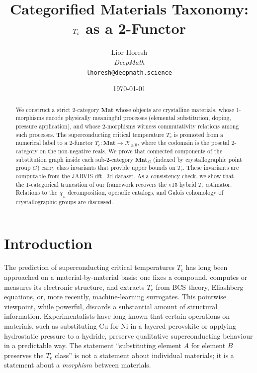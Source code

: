\documentclass[12pt,a4paper]{article}
\title{Categorified Materials Taxonomy:\\
$\Tc$ as a 2-Functor}
\author{Lior Horesh\\[4pt]
\textit{DeepMath}\\[2pt]
\texttt{lhoresh@deepmath.science}}
\date{\today}
\theoremstyle{plain}
\theoremstyle{definition}
\theoremstyle{remark}
\newcommand{\Tc}{T_{\mathrm{c}}}
\newcommand{\Matl}{\mathbf{Mat}}
\newcommand{\MatlG}{\mathbf{Mat}_G}
\newcommand{\chin}{\chi_n}
\begin{document}
\maketitle

\begin{abstract}
We construct a strict 2-category $\Matl$ whose objects are crystalline
materials, whose 1-morphisms encode physically meaningful processes (elemental
substitution, doping, pressure application), and whose 2-morphisms witness
commutativity relations among such processes.  The superconducting critical
temperature $\Tc$ is promoted from a numerical label to a 2-functor
$\Tc \colon \Matl \to \mathscr{R}_{\geq 0}$, where the codomain is the
posetal 2-category on the non-negative reals.  We prove that connected
components of the substitution graph inside each sub-2-category $\MatlG$
(indexed by crystallographic point group $G$) carry class invariants that
provide upper bounds on $\Tc$.  These invariants are computable from the
JARVIS dft\_3d dataset.  As a consistency check, we show that the
1-categorical truncation of our framework recovers the v15 hybrid $\Tc$
estimator.  Relations to the $\chin$ decomposition, operadic catalogs, and
Galois cohomology of crystallographic groups are discussed.
\end{abstract}

\tableofcontents
\newpage

\section{Introduction}\label{sec:intro}

The prediction of superconducting critical temperatures $\Tc$ has long been
approached on a material-by-material basis: one fixes a compound, computes or
measures its electronic structure, and extracts $\Tc$ from BCS theory, Eliashberg
equations, or, more recently, machine-learning surrogates.  This pointwise
viewpoint, while powerful, discards a substantial amount of structural
information.  Experimentalists have long known that certain operations on
materials, such as substituting Cu for Ni in a layered perovskite or applying
hydrostatic pressure to a hydride, preserve qualitative superconducting behaviour
in a predictable way.  The statement ``substituting element $A$ for element $B$
preserves the $\Tc$ class'' is not a statement about individual materials; it is
a statement about a \emph{morphism} between materials.
\end{document}
